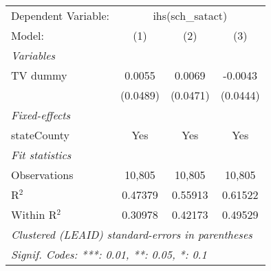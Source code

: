\begin{tabular}{lccc}
\tabularnewline\midrule\midrule
Dependent Variable:&\multicolumn{3}{c}{ihs(sch\_satact)}\\
Model:&(1) & (2) & (3)\\
\midrule \emph{Variables}&   &   &  \\
TV dummy & 0.0055 & 0.0069 & -0.0043\\
  &(0.0489) & (0.0471) & (0.0444)\\
\midrule \emph{Fixed-effects}&   &   &  \\
stateCounty & Yes & Yes & Yes\\
\midrule \emph{Fit statistics}&  & & \\
Observations & 10,805&10,805&10,805\\
R$^2$ & 0.47379&0.55913&0.61522\\
Within R$^2$ & 0.30978&0.42173&0.49529\\
\midrule\midrule\multicolumn{4}{l}{\emph{Clustered (LEAID) standard-errors in parentheses}}\\
\multicolumn{4}{l}{\emph{Signif. Codes: ***: 0.01, **: 0.05, *: 0.1}}\\
\end{tabular}


